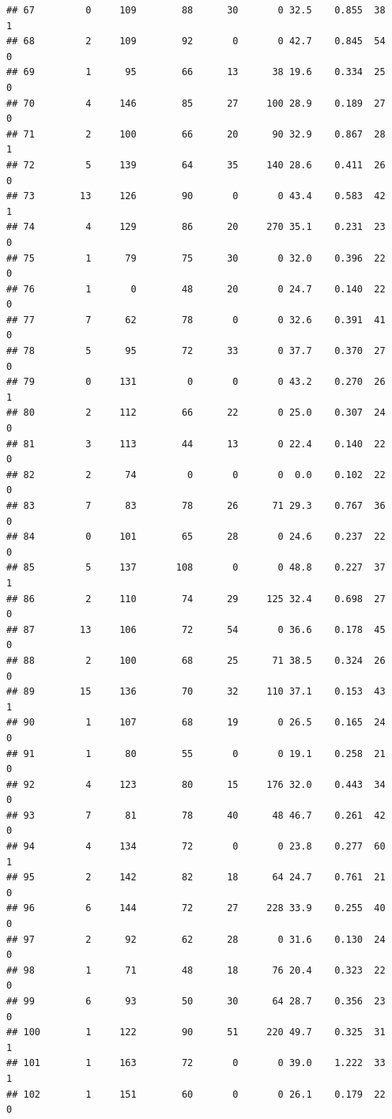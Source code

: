 \documentclass[11pt, a4paper]{article}\usepackage[]{graphicx}\usepackage[]{xcolor}
\makeatletter
\newenvironment{kframe}{%
 \def\at@end@of@kframe{}%
 \ifinner\ifhmode%
  \def\at@end@of@kframe{\end{minipage}}%
  \begin{minipage}{\columnwidth}%
 \fi\fi%
 \def\FrameCommand##1{\hskip\@totalleftmargin \hskip-\fboxsep
 \colorbox{shadecolor}{##1}\hskip-\fboxsep
     \hskip-\linewidth \hskip-\@totalleftmargin \hskip\columnwidth}%
 \MakeFramed {\advance\hsize-\width
   \@totalleftmargin\z@ \linewidth\hsize
   \@setminipage}}%
 {\par\unskip\endMakeFramed%
 \at@end@of@kframe}
\newenvironment{knitrout}{}{} %
\makeatother
\begin{document}
\begin{knitrout}
\begin{kframe}
\begin{verbatim}
## 67         0     109        88      30       0 32.5    0.855  38    1
## 68         2     109        92       0       0 42.7    0.845  54    0
## 69         1      95        66      13      38 19.6    0.334  25    0
## 70         4     146        85      27     100 28.9    0.189  27    0
## 71         2     100        66      20      90 32.9    0.867  28    1
## 72         5     139        64      35     140 28.6    0.411  26    0
## 73        13     126        90       0       0 43.4    0.583  42    1
## 74         4     129        86      20     270 35.1    0.231  23    0
## 75         1      79        75      30       0 32.0    0.396  22    0
## 76         1       0        48      20       0 24.7    0.140  22    0
## 77         7      62        78       0       0 32.6    0.391  41    0
## 78         5      95        72      33       0 37.7    0.370  27    0
## 79         0     131         0       0       0 43.2    0.270  26    1
## 80         2     112        66      22       0 25.0    0.307  24    0
## 81         3     113        44      13       0 22.4    0.140  22    0
## 82         2      74         0       0       0  0.0    0.102  22    0
## 83         7      83        78      26      71 29.3    0.767  36    0
## 84         0     101        65      28       0 24.6    0.237  22    0
## 85         5     137       108       0       0 48.8    0.227  37    1
## 86         2     110        74      29     125 32.4    0.698  27    0
## 87        13     106        72      54       0 36.6    0.178  45    0
## 88         2     100        68      25      71 38.5    0.324  26    0
## 89        15     136        70      32     110 37.1    0.153  43    1
## 90         1     107        68      19       0 26.5    0.165  24    0
## 91         1      80        55       0       0 19.1    0.258  21    0
## 92         4     123        80      15     176 32.0    0.443  34    0
## 93         7      81        78      40      48 46.7    0.261  42    0
## 94         4     134        72       0       0 23.8    0.277  60    1
## 95         2     142        82      18      64 24.7    0.761  21    0
## 96         6     144        72      27     228 33.9    0.255  40    0
## 97         2      92        62      28       0 31.6    0.130  24    0
## 98         1      71        48      18      76 20.4    0.323  22    0
## 99         6      93        50      30      64 28.7    0.356  23    0
## 100        1     122        90      51     220 49.7    0.325  31    1
## 101        1     163        72       0       0 39.0    1.222  33    1
## 102        1     151        60       0       0 26.1    0.179  22    0

\end{verbatim}
\end{kframe}
\end{knitrout}
\end{document}
